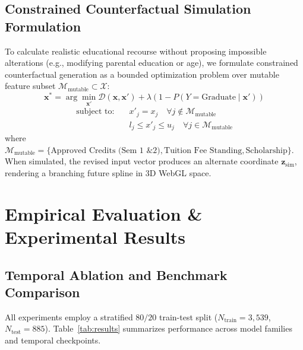 \documentclass[conference]{IEEEtran}
\begin{document}
\subsection{Constrained Counterfactual Simulation Formulation}
To calculate realistic educational recourse without proposing impossible alterations (e.g., modifying parental education or age), we formulate constrained counterfactual generation as a bounded optimization problem over mutable feature subset $\mathcal{M}_{\text{mutable}} \subset \mathcal{X}$:
\begin{equation}
    \mathbf{x}^* = \arg\min_{\mathbf{x}'} \mathcal{D}(\mathbf{x}, \mathbf{x}') + \lambda \left( 1 - P(Y = \text{Graduate} \mid \mathbf{x}') \right)
\end{equation}
\begin{align}
    \text{subject to:} \quad & x'_j = x_j \quad \forall j \notin \mathcal{M}_{\text{mutable}} \nonumber \\
    & l_j \le x'_j \le u_j \quad \forall j \in \mathcal{M}_{\text{mutable}}
\end{align}
where $\mathcal{M}_{\text{mutable}} = \{\text{Approved Credits (Sem 1 \& 2)}, \text{Tuition Fee Standing}, \text{Scholarship}\}$. When simulated, the revised input vector produces an alternate coordinate $\mathbf{z}_{\text{sim}}$, rendering a branching future spline in 3D WebGL space.

\section{Empirical Evaluation \& Experimental Results}

\subsection{Temporal Ablation and Benchmark Comparison}
All experiments employ a stratified $80/20$ train-test split ($N_{\text{train}} = 3,539$, $N_{\text{test}} = 885$). Table~\ref{tab:results} summarizes performance across model families and temporal checkpoints.
\end{document}
